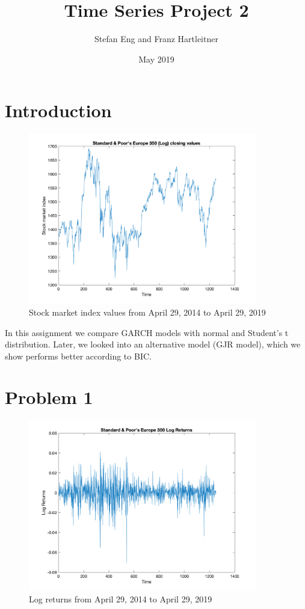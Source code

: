\documentclass{article}
\title{Time Series Project 2}
\author{Stefan Eng and Franz Hartleitner}
\date{May 2019}
\begin{document}
\maketitle

\section{Introduction}

\begin{figure}[H]
  \centering
\includegraphics[width=10cm]{plots/log_index.png}
\centering
\caption{Stock market index values from April 29, 2014 to April 29, 2019}
\label{fig:log_index}
\end{figure}

In this assignment we compare GARCH models with normal and Student's t distribution.
Later, we looked into an alternative model (GJR model), which we show performs better according to BIC.


\section*{Problem 1}

\begin{figure}[H]
  \centering
\includegraphics[width=10cm]{plots/returns.png}
\centering
\caption{Log returns from April 29, 2014 to April 29, 2019}
\label{fig:returns}
\end{figure}
\end{document}
